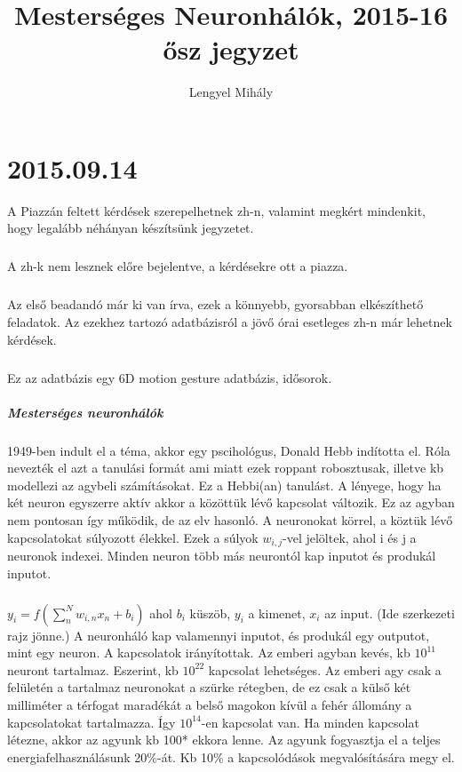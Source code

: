 \documentclass[10pt,a4paper]{report}
\title{Mesterséges Neuronhálók, 2015-16 ősz jegyzet}
\author{Lengyel Mihály}
\begin{document}
\maketitle

\chapter{2015.09.14}

A Piazzán feltett kérdések szerepelhetnek zh-n, valamint megkért mindenkit, hogy legalább néhányan készítsünk jegyzetet.
\paragraph{}
A zh-k nem lesznek előre bejelentve, a kérdésekre ott a piazza.
\paragraph{}
Az első beadandó már ki van írva, ezek a könnyebb, gyorsabban elkészíthető feladatok. Az ezekhez tartozó adatbázisról a jövő órai esetleges zh-n már lehetnek kérdések.
\paragraph{}
Ez az adatbázis egy 6D motion gesture adatbázis, idősorok.

\paragraph{Mesterséges neuronhálók}
1949-ben indult el a téma, akkor egy pscihológus, Donald Hebb indította el. Róla nevezték el azt a tanulási formát ami miatt ezek roppant robosztusak, illetve kb modellezi az agybeli számításokat. Ez a Hebbi(an) tanulást. A lényege, hogy ha két neuron egyszerre aktív akkor a közöttük lévő kapcsolat változik. Ez az agyban nem pontosan így működik, de az elv hasonló. A neuronokat körrel, a köztük lévő kapcsolatokat súlyozott élekkel. Ezek a súlyok $w_{i,j}$-vel jelöltek, ahol i és j a neuronok indexei. Minden neuron több más neurontól kap inputot és produkál inputot.
\paragraph{}
$y_i=f(\sum_n^N w_{i,n}x_n + b_i)$ ahol $b_i$ küszöb, $y_i$ a kimenet, $x_i$ az input.
(Ide szerkezeti rajz jönne.) A neuronháló kap valamennyi inputot, és produkál egy outputot, mint egy neuron.
A kapcsolatok irányítottak.
Az emberi agyban kevés, kb $10^11$ neuront tartalmaz. Eszerint, kb $10^22$ kapcsolat lehetséges. Az emberi agy csak a felületén a tartalmaz neuronokat a szürke rétegben, de ez csak a külső két milliméter a térfogat maradékát a belső magokon kívül a fehér állomány a kapcsolatokat tartalmazza. Így $10^14$-en kapcsolat van. Ha minden kapcsolat létezne, akkor az agyunk kb 100* ekkora lenne. Az agyunk fogyasztja el a teljes energiafelhasználásunk 20\%-át. Kb 10\% a kapcsolódások megvalósítására megy el.
\end{document}
